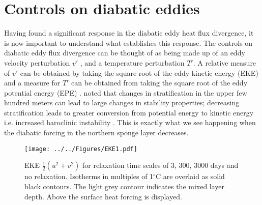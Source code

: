 \section{Controls on diabatic eddies}
Having found a significant response in the diabatic eddy heat flux divergence, it is now important to understand what establishes this response. 
The controls on diabatic eddy flux divergence can be thought of as being made up of an eddy velocity perturbation $v'$ , and a temperature perturbation $T'$. A relative measure of $v'$ can be obtained by taking the square root of the eddy kinetic energy (EKE) and a measure for $T'$ can be obtained from taking the square root of the eddy potential energy (EPE) \citep{VonStorch2012}. 
\cite{Gill1974a} noted that changes in stratification in the upper few hundred meters can lead to large changes in stability properties; decreasing stratification leads to greater conversion from potential energy to kinetic energy i.e. increased baroclinic instability \citep{Legg2001}. This is exactly what we see happening when the diabatic forcing in the northern sponge layer decreases.

\begin{figure}
\noindent \texttt{[image: ../../Figures/EKE1.pdf]} 
\caption{EKE $\frac{1}{2}(u^2 + v^2)$ for relaxation time scales of 3, 300, 3000 days and no relaxation. Isotherms in multiples of 1$^{\circ}$C are overlaid as solid black contours. The light grey contour indicates the mixed layer depth. Above the surface heat forcing is displayed. }
\label{fig:EKE_flat}
\end{figure}

